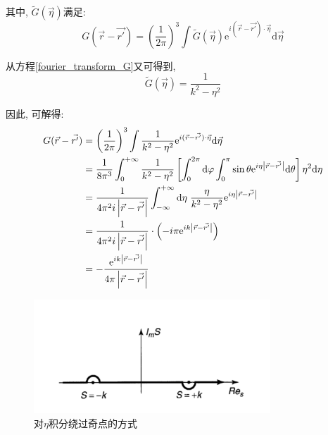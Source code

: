 \documentclass[a4paper, 11pt]{article}
\begin{document}
\begin{spacing}{1.2}
          其中, $\tilde{G}(\vec{\eta})$满足:
          \begin{equation}
            G(\vec{r}-\vec{r'}) = \left(\dfrac{1}{2\pi}\right)^3 \int{}\tilde{G}(\vec{\eta})%
                                        \mathrm{e}^{i(\vec{r}-\vec{r'})\cdot\vec{\eta}}%
                                        \mathrm{d}\vec{\eta} 
          \end{equation}

          从方程\eqref{fourier_transform_G}又可得到, 
          \begin{equation}
            \tilde{G}(\vec{\eta}) = \dfrac{1}{k^2-\eta^2}            
          \end{equation}

          因此, 可解得:
          \begin{equation}
            \begin{aligned}
              G(\vec{r}-\vec{r'}) &= \left(\dfrac{1}{2\pi}\right)^3 \int{}\dfrac{1}{k^2-\eta^2}%
                                          \mathrm{e}^{i(\vec{r}-\vec{r'})\cdot\vec{\eta}}%
                                          \mathrm{d}\vec{\eta}\\
                                  &= \dfrac{1}{8\pi^3}\int_0^{+\infty}\dfrac{1}{k^2-\eta^2}%
                                      \left[\int_0^{2\pi}\mathrm{d}\varphi\int_0^{\pi}\sin\theta%
                                      \mathrm{e}^{i\eta\left|\vec{r}-\vec{r'}\right|}\mathrm{d}\theta\right] %
                                      \eta^2\mathrm{d}\eta\\
                                  &= \dfrac{1}{4\pi^2i\left|\vec{r}-\vec{r'}\right|}\int_{-\infty}^{+\infty}%
                                      \mathrm{d}\eta\;\dfrac{\eta}{k^2-\eta^2} \mathrm{e}^{i\eta\left|\vec{r}-\vec{r'}\right|}\\
                                  &= \dfrac{1}{4\pi^2i\left|\vec{r}-\vec{r'}\right|} \cdot \left(-i\pi\mathrm{e}^%
                                  {ik\left|\vec{r}-\vec{r'}\right|}\right)\\
                                  &= -\dfrac{\mathrm{e}^{ik\left|\vec{r}-\vec{r'}\right|}}%
                                            {4\pi\left|\vec{r}-\vec{r'}\right|}
            \end{aligned}
          \end{equation}

          \begin{figure}
            \centering\includegraphics[width=3.5in]{image/Born_route_int}
            \caption{对$\eta$积分绕过奇点的方式}\label{Born_route_int}
          \end{figure} 


\end{spacing}
\end{document}
